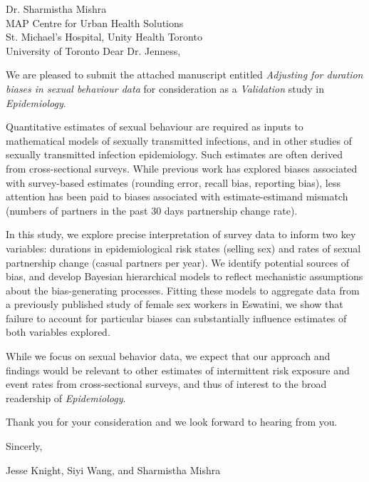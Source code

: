 \address{
  Dr. Samuel Jenness\\
  Editor\\
  Epidemiology
}{Dr. Sharmistha Mishra\\
  MAP Centre for Urban Health Solutions\\
  St. Michael's Hospital, Unity Health Toronto\\
  University of Toronto}
Dear Dr. Jenness,
\par
We are pleased to submit the attached manuscript entitled
\emph{Adjusting for duration biases in sexual behaviour data}
for consideration as a \emph{Validation} study in \emph{Epidemiology}.
\par
Quantitative estimates of sexual behaviour are required
as inputs to mathematical models of sexually transmitted infections,
and in other studies of sexually transmitted infection epidemiology.
Such estimates are often derived from cross-sectional surveys.
While previous work has explored biases associated with survey-based estimates
(\eg rounding error, recall bias, reporting bias),
less attention has been paid to biases associated with estimate-estimand mismatch
(\eg numbers of partners in the past 30 days \vs partnership change rate).
\par
In this study, we explore precise interpretation of survey data to inform two key variables:
durations in epidemiological risk states (\eg selling sex) and
rates of sexual partnership change (\eg casual partners per year).
We identify potential sources of bias,
and develop Bayesian hierarchical models to reflect
mechanistic assumptions about the bias-generating processes.
Fitting these models to aggregate data from
a previously published study of female sex workers in Eswatini,
we show that failure to account for particular biases can
substantially influence estimates of both variables explored.
\par
While we focus on sexual behavior data,
we expect that our approach and findings would be relevant to
other estimates of intermittent risk exposure and event rates from cross-sectional surveys,
and thus of interest to the broad readership of \emph{Epidemiology}.
\par
Thank you for your consideration and we look forward to hearing from you.
\medskip\par
Sincerly,
\par
Jesse Knight, Siyi Wang, and Sharmistha Mishra